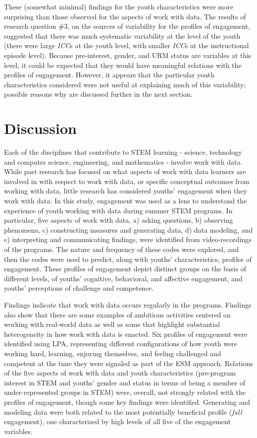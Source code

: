 \documentclass[]{book}
\theoremstyle{definition}
\theoremstyle{definition}
\theoremstyle{definition}
\theoremstyle{remark}
\begin{document}
These (somewhat minimal) findings for the youth characteristics were
more surprising than those observed for the aspects of work with data.
The results of research question \#3, on the sources of variability for
the profiles of engagement, suggested that there was much systematic
variability at the level of the youth (there were large \emph{ICC}s at
the youth level, with smaller \emph{ICC}s at the instructional episode
level). Because pre-interest, gender, and URM status are variables at
this level, it could be expected that they would have meaningful
relations with the profiles of engagement. However, it appears that the
particular youth characteristics considered were not useful at
explaining much of this variability; possible reasons why are discussed
further in the next section.

\chapter{Discussion}\label{discussion}

Each of the disciplines that contribute to STEM learning - science,
technology and computer science, engineering, and mathematics - involve
work with data. While past research has focused on what aspects of work
with data learners are involved in with respect to work with data, or
specific conceptual outcomes from working with data, little research has
considered youths' engagement when they work with data. In this study,
engagement was used as a lens to understand the experience of youth
working with data during summer STEM programs. In particular, five
aspects of work with data, a) asking questions, b) observing phenomena,
c) constructing measures and generating data, d) data modeling, and e)
interpreting and communicating findings, were identified from
video-recordings of the programs. The nature and frequency of these
codes were explored, and then the codes were used to predict, along with
youths' characteristics, profiles of engagement. These profiles of
engagement depict distinct groups on the basis of different levels, of
youths' cognitive, behavioral, and affective engagement, and youths'
perceptions of challenge and competence.

Findings indicate that work with data occurs regularly in the programs.
Findings also show that there are some examples of ambitious activities
centered on working with real-world data as well as some that highlight
substantial heterogeneity in how work with data is enacted. Six profiles
of engagement were identified using LPA, representing different
configurations of how youth were working hard, learning, enjoying
themselves, and feeling challenged and competent at the time they were
signaled as part of the ESM approach. Relations of the five aspects of
work with data and youth characteristics (pre-program interest in STEM
and youths' gender and status in terms of being a member of
under-represented groups in STEM) were, overall, not strongly related
with the profiles of engagement, though some key findings were
identified. Generating and modeling data were both related to the most
potentially beneficial profile (\emph{full} engagement), one
characterized by high levels of all five of the engagement variables.
\end{document}
